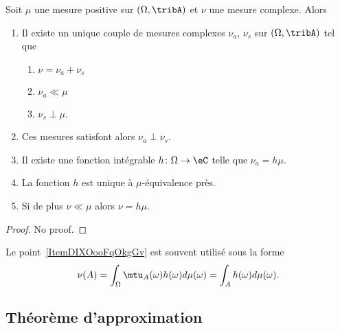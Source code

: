 \begin{theorem}\label{ThoZZMGooKhRYaO}
	Soit \( \mu\) une mesure positive sur \( (\Omega,\tribA)\) et \( \nu\) une mesure complexe. Alors
	\begin{enumerate}
		\item
		      Il existe un unique couple de mesures complexes \( \nu_a\), \( \nu_s\) sur \( (\Omega,\tribA)\) tel que
		      \begin{enumerate}
			      \item
			            \( \nu=\nu_a+\nu_s\)
			      \item
			            \( \nu_a\ll\mu\)
			      \item
			            \( \nu_s\perp \mu\).
		      \end{enumerate}
		\item
		      Ces mesures satisfont alors \( \nu_a\perp\nu_s\).
		\item
		      Il existe une fonction intégrable \( h\colon \Omega\to \eC\) telle que \( \nu_a=h\mu\).
		\item
		      La fonction \( h\) est unique à \( \mu\)-équivalence près.
		\item   \label{ItemDIXOooFqOkgGv}
		      Si de plus \( \nu\ll \mu\) alors \( \nu=h\mu\).
	\end{enumerate}
\end{theorem}
\begin{proof}
	No proof.
\end{proof}

\begin{remark}  \label{RemSYRMooZPBhbQ}
	Le point~\ref{ItemDIXOooFqOkgGv} est souvent utilisé sous la forme
	\begin{equation}
		\nu(A)=\int_{\Omega}\mtu_A(\omega)h(\omega)d\mu(\omega)=\int_{A}h(\omega)d\mu(\omega).
	\end{equation}
\end{remark}

\subsection{Théorème d'approximation}

